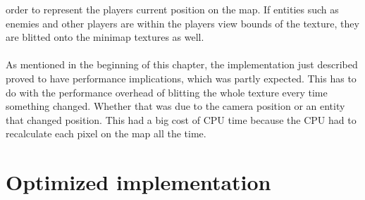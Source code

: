order to represent the players current position on the map. If entities such as
enemies and other players are within the players view bounds of the
texture, they are blitted onto the minimap textures as well. 
\\
\\
As mentioned in the beginning of this chapter, the implementation just
described proved to have performance implications, which was partly expected. 
This has to do with the performance overhead of blitting the whole texture every time something changed.
Whether that was due to the camera position or an entity that changed position.
This had a big cost of CPU time because the CPU had to recalculate each pixel on the map all the time.

\section{Optimized implementation}

